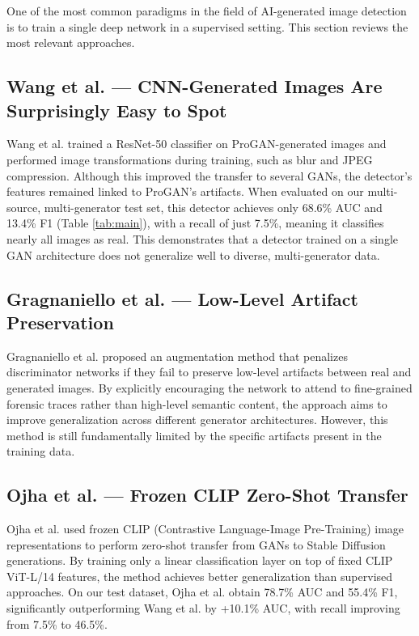 \documentclass[12pt,a4paper]{book}
\theoremstyle{definition}
\theoremstyle{remark}
\begin{document}
One of the most common paradigms in the field of AI-generated image detection is to train a single deep network in a supervised setting. This section reviews the most relevant approaches.


\subsection{Wang et al. --- CNN-Generated Images Are Surprisingly Easy to Spot}\label{sec:wang}

Wang et al. \cite{wang2020cnn} trained a ResNet-50 classifier on ProGAN-generated images and performed image transformations during training, such as blur and JPEG compression. Although this improved the transfer to several GANs, the detector's features remained linked to ProGAN's artifacts. When evaluated on our multi-source, multi-generator test set, this detector achieves only 68.6\% AUC and 13.4\% F1 (Table \ref{tab:main}), with a recall of just 7.5\%, meaning it classifies nearly all images as real. This demonstrates that a detector trained on a single GAN architecture does not generalize well to diverse, multi-generator data.


\subsection{Gragnaniello et al. --- Low-Level Artifact Preservation}\label{sec:gragnaniello}

Gragnaniello et al. \cite{gragnaniello2021gan} proposed an augmentation method that penalizes discriminator networks if they fail to preserve low-level artifacts between real and generated images. By explicitly encouraging the network to attend to fine-grained forensic traces rather than high-level semantic content, the approach aims to improve generalization across different generator architectures. However, this method is still fundamentally limited by the specific artifacts present in the training data.


\subsection{Ojha et al. --- Frozen CLIP Zero-Shot Transfer}\label{sec:ojha}

Ojha et al. \cite{ojha2023towards} used frozen CLIP (Contrastive Language-Image Pre-Training) image representations to perform zero-shot transfer from GANs to Stable Diffusion generations. By training only a linear classification layer on top of fixed CLIP ViT-L/14 features, the method achieves better generalization than supervised approaches. On our test dataset, Ojha et al. obtain 78.7\% AUC and 55.4\% F1, significantly outperforming Wang et al. by +10.1\% AUC, with recall improving from 7.5\% to 46.5\%.
\end{document}
